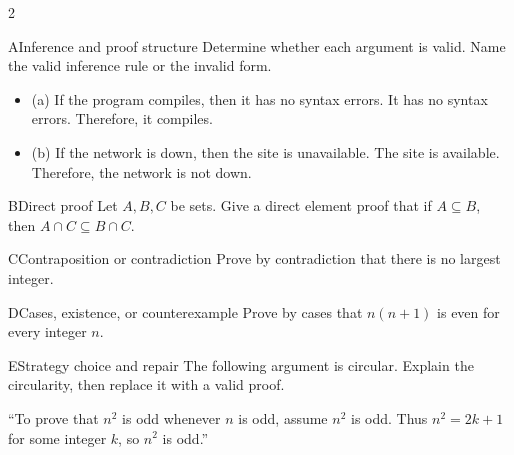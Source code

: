 \documentclass[9pt]{extarticle}
\begin{document}
\begin{multicols}{2}
\begin{CoreProblem}{A}{Inference and proof structure}
Determine whether each argument is valid. Name the valid inference rule or the invalid form.
\begin{itemize}
  \item (a) If the program compiles, then it has no syntax errors. It has no syntax errors. Therefore, it compiles.
  \item (b) If the network is down, then the site is unavailable. The site is
        available. Therefore, the network is not down.
\end{itemize}
\end{CoreProblem}
\begin{CoreProblem}{B}{Direct proof}
Let $A,B,C$ be sets. Give a direct element proof that if $A\subseteq B$, then
$A\cap C\subseteq B\cap C$.
\end{CoreProblem}
\begin{CoreProblem}{C}{Contraposition or contradiction}
Prove by contradiction that there is no largest integer.
\end{CoreProblem}
\columnbreak
\begin{CoreProblem}{D}{Cases, existence, or counterexample}
Prove by cases that $n(n+1)$ is even for every integer $n$.
\end{CoreProblem}
\begin{CoreProblem}{E}{Strategy choice and repair}
The following argument is circular. Explain the circularity, then replace it with a valid proof.

``To prove that $n^2$ is odd whenever $n$ is odd, assume $n^2$ is odd. Thus
$n^2=2k+1$ for some integer $k$, so $n^2$ is odd.''
\end{CoreProblem}
\end{multicols}
\CoreWorkArea
\FormBreak
{}
\end{document}
